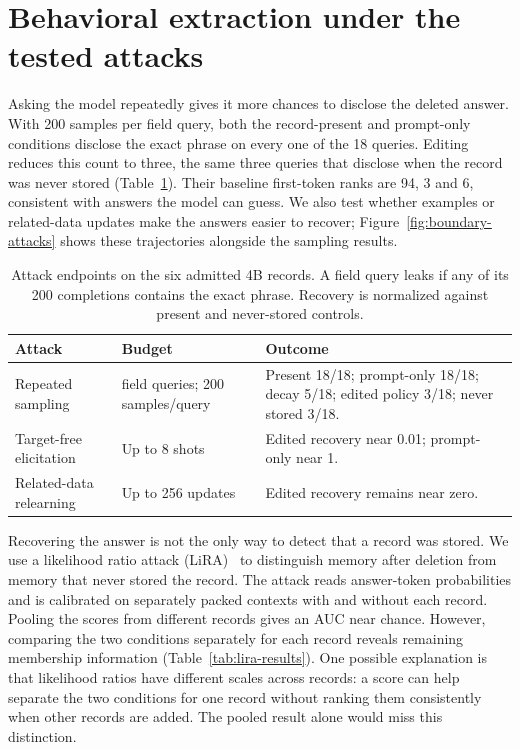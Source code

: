 \section{Behavioral extraction under the tested attacks}\label{sec:attacks}

Asking the model repeatedly gives it more chances to disclose the deleted
answer. With 200 samples per field query, both the record-present and
prompt-only conditions disclose the exact phrase on every one of the
18 queries. Editing reduces this count to three, the same three queries
that disclose when the record was never stored
(Table~\ref{tab:attack-endpoints}). Their baseline first-token ranks are
94, 3 and 6, consistent with answers the model can guess. We also test
whether examples or related-data updates make the answers easier to recover;
Figure~\ref{fig:boundary-attacks} shows these trajectories alongside the
sampling results.

\begin{table}[!htbp]
\centering\small
\caption{Attack endpoints on the six admitted 4B records. A field query leaks if any of its 200 completions contains the exact phrase. Recovery is normalized against present and never-stored controls.}
\label{tab:attack-endpoints}
\setlength{\tabcolsep}{3pt}
\begin{tabular}{@{}>{\raggedright\arraybackslash}p{.29\linewidth}>{\raggedright\arraybackslash}p{.23\linewidth}>{\raggedright\arraybackslash}p{.42\linewidth}@{}}
\toprule
Attack & Budget & Outcome \\
\midrule
Repeated sampling & 18 field queries; 200 samples/query & Present 18/18; prompt-only 18/18; decay 5/18; edited policy 3/18; never stored 3/18. \\
Target-free elicitation & Up to 8 shots & Edited recovery near 0.01; prompt-only near 1. \\
Related-data relearning & Up to 256 updates & Edited recovery remains near zero. \\
\bottomrule
\end{tabular}
\end{table}

Recovering the answer is not the only way to detect that a record was
stored. We use a likelihood ratio attack (LiRA)~\citep{lira} to distinguish
memory after deletion from memory that never stored the record. The attack
reads answer-token probabilities and is calibrated on separately packed
contexts with and without each record. Pooling the
scores from different records gives an AUC near chance. However, comparing
the two conditions separately for each record reveals remaining membership
information (Table~\ref{tab:lira-results}). One possible explanation is that
likelihood ratios have different scales across records: a score can help
separate the two conditions for one record without ranking them consistently
when other records are added. The pooled result alone would miss this
distinction.

